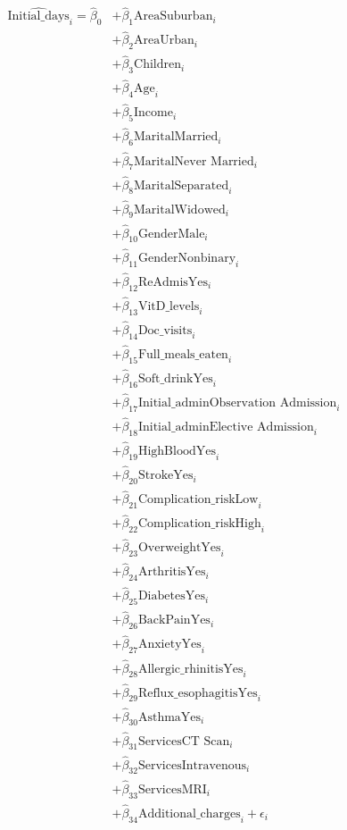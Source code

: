 \documentclass[
]{article}
\begin{document}
\[
\begin{align}
\hat{\text{Initial_days}}_i = \hat{\beta}_0
    &+ \hat{\beta}_1 \text{AreaSuburban}_i \\
    &+ \hat{\beta}_2 \text{AreaUrban}_i \\
    &+ \hat{\beta}_3 \text{Children}_i \\
    &+ \hat{\beta}_4 \text{Age}_i \\
    &+ \hat{\beta}_5 \text{Income}_i \\
    &+ \hat{\beta}_6 \text{MaritalMarried}_i \\
    &+ \hat{\beta}_7 \text{MaritalNever Married}_i \\
    &+ \hat{\beta}_8 \text{MaritalSeparated}_i \\
    &+ \hat{\beta}_9 \text{MaritalWidowed}_i \\
    &+ \hat{\beta}_{10} \text{GenderMale}_i \\
    &+ \hat{\beta}_{11} \text{GenderNonbinary}_i \\
    &+ \hat{\beta}_{12} \text{ReAdmisYes}_i \\
    &+ \hat{\beta}_{13} \text{VitD_levels}_i \\
    &+ \hat{\beta}_{14} \text{Doc_visits}_i \\
    &+ \hat{\beta}_{15} \text{Full_meals_eaten}_i \\
    &+ \hat{\beta}_{16} \text{Soft_drinkYes}_i \\
    &+ \hat{\beta}_{17} \text{Initial_adminObservation Admission}_i \\
    &+ \hat{\beta}_{18} \text{Initial_adminElective Admission}_i \\
    &+ \hat{\beta}_{19} \text{HighBloodYes}_i \\
    &+ \hat{\beta}_{20} \text{StrokeYes}_i \\
    &+ \hat{\beta}_{21} \text{Complication_riskLow}_i \\
    &+ \hat{\beta}_{22} \text{Complication_riskHigh}_i \\
    &+ \hat{\beta}_{23} \text{OverweightYes}_i \\
    &+ \hat{\beta}_{24} \text{ArthritisYes}_i \\
    &+ \hat{\beta}_{25} \text{DiabetesYes}_i \\
    &+ \hat{\beta}_{26} \text{BackPainYes}_i \\
    &+ \hat{\beta}_{27} \text{AnxietyYes}_i \\
    &+ \hat{\beta}_{28} \text{Allergic_rhinitisYes}_i \\
    &+ \hat{\beta}_{29} \text{Reflux_esophagitisYes}_i \\
    &+ \hat{\beta}_{30} \text{AsthmaYes}_i \\
    &+ \hat{\beta}_{31} \text{ServicesCT Scan}_i \\
    &+ \hat{\beta}_{32} \text{ServicesIntravenous}_i \\
    &+ \hat{\beta}_{33} \text{ServicesMRI}_i \\ 
    &+ \hat{\beta}_{34} \text{Additional_charges}_i + \hat{\epsilon_i}
\end{align}
\]
\end{document}
